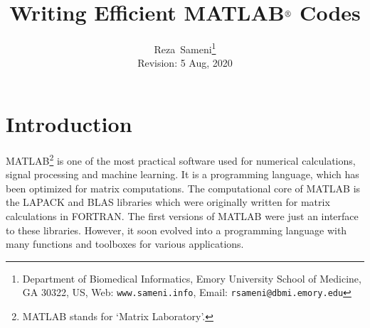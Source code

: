 \documentclass[10pt,a4paper]{article}
\begin{document}
\title{Writing Efficient MATLAB$^{\text{\small{\textregistered}}}$ Codes}
\author{Reza~Sameni\footnote{Department of Biomedical Informatics, Emory University School of Medicine, GA 30322, US, Web: \texttt{www.sameni.info}, Email: \texttt{rsameni@dbmi.emory.edu}}\\
Revision: 5 Aug, 2020}
\date{}
\maketitle
\thispagestyle{empty}
\section{Introduction}
\label{sec:introduction}
MATLAB\footnote{MATLAB stands for `Matrix Laboratory'.} is one of the most practical software used for numerical calculations, signal processing and machine learning. It is a programming language, which has been optimized for matrix computations. The computational core of MATLAB is the LAPACK and BLAS libraries which were originally written for matrix calculations in FORTRAN. The first versions of MATLAB were just an interface to these libraries. However, it soon evolved into a programming language with many functions and toolboxes for various applications.
\end{document}
